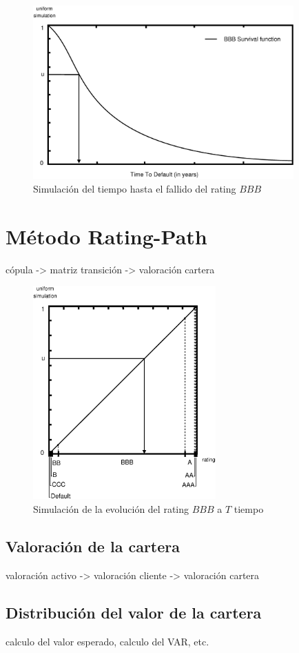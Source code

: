 \begin{figure}[!hb]
\begin{center}
\includegraphics[width=10cm,angle=0]{./images/simttd.eps}
\caption{Simulaci\'on del tiempo hasta el fallido del rating $BBB$}
\label{simttd}
\end{center}
\end{figure}


\section{M\'etodo Rating-Path}
c\'opula -> matriz transici\'on -> valoraci\'on cartera

\begin{figure}[!hb]
\begin{center}
\includegraphics[width=7cm,angle=0]{./images/simrp.eps}
\caption{Simulaci\'on de la evoluci\'on del rating $BBB$ a $T$ tiempo}
\label{simrp}
\end{center}
\end{figure}


\subsection{Valoraci\'on de la cartera}
valoraci\'on activo -> valoraci\'on cliente -> valoraci\'on cartera

\subsection{Distribuci\'on del valor de la cartera}
calculo del valor esperado, calculo del VAR, etc.

